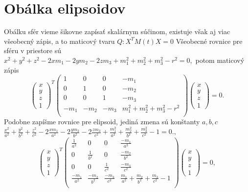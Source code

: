 \section{Obálka elipsoidov}
Obálku sfér vieme šikovne zapísať skalárnym súčinom, existuje však aj viac všeobecný zápis, a to maticový tvaru $Q: X^TM(t)X = 0$
Všeobecné rovnice pre sféru v priestore sú
$ x^2 +y^2 +z^2 -2xm_1 -2ym_2 - 2zm_3 + m_1^2 + m_2^2 + m_3^2 - r^2 =0
,$
potom maticový zápis
$$
\left(\begin{matrix} x \\ y \\ z  \\ 1
\end{matrix} \right)^T \left(\begin{matrix} 
1 & 0 & 0 & - m_1 \\
0 & 1 & 0 & - m_2 \\
0 & 0 & 1 & - m_3 \\
- m_1 & - m_2 & - m_3 &  m_1^2 + m_2^2 + m_3^2 - r^2 \\
\end{matrix} \right)\left(\begin{matrix} x \\ y \\ z \\ 1
\end{matrix} \right) = 0. 
$$
Podobne zapíšme rovnice pre elipsoid, jediná zmena sú konštanty $a, b, c$
$ \frac{x^2}{a^2} + \frac{y^2}{b^2} + \frac{z^2}{c^2} - 2 \frac{xm_1}{a^2} - 2 \frac{ym_2}{b^2} - 2 \frac{zm_3}{c^2} + \frac{m_1^2}{a^2} + \frac{m_2^2}{b^2} + \frac{m_3^2}{c^2} - 1 =0.
,$
$$
\left(\begin{matrix} x \\ y \\ z  \\ 1
\end{matrix} \right)^T \left(\begin{matrix} 
\frac{1}{a^2} & 0 & 0 & \frac{-m_1}{a^2} \\
0 & \frac{1}{b^2} & 0 & \frac{-m_2}{b^2} \\
0 & 0 & \frac{1}{c^2} & \frac{-m_3}{c^2} \\
\frac{-m_1}{a^2} & \frac{-m_2}{b^2} & \frac{-m_3}{c^2} & \frac{m_1}{a^2} + \frac{m_2}{b^2} + \frac{m_3}{c^2} - 1 \\
\end{matrix} \right)\left(\begin{matrix} x \\ y \\ z \\ 1
\end{matrix} \right) = 0,
$$
